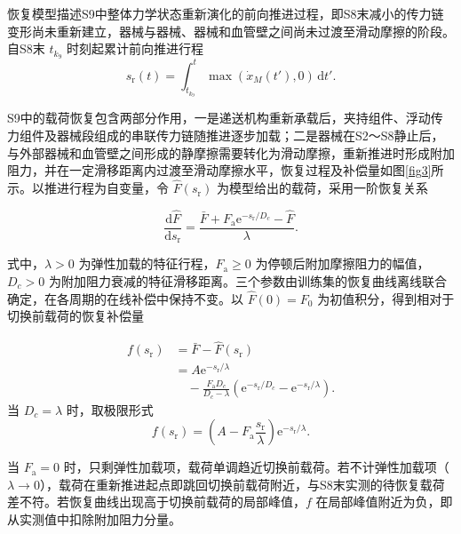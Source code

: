\documentclass{JQR_LaTeX_Template-0507/JQRnew}
\begin{document}
恢复模型描述S9中整体力学状态重新演化的前向推进过程，即S8末减小的传力链变形尚未重新建立，器械与器械、器械和血管壁之间尚未过渡至滑动摩擦的阶段。自S8末 $t_{k_9}$ 时刻起累计前向推进行程
\begin{equation}
\label{eq:recovery-travel}
s_{\mathrm r}(t)=\int_{t_{k_9}}^{t}
\max\!\left(\dot x_M(t'),0\right)\,\mathrm dt'.
\end{equation}


S9中的载荷恢复包含两部分作用，一是递送机构重新承载后，夹持组件、浮动传力组件及器械段组成的串联传力链随推进逐步加载；二是器械在S2～S8静止后，与外部器械和血管壁之间形成的静摩擦需要转化为滑动摩擦，重新推进时形成附加阻力，并在一定滑移距离内过渡至滑动摩擦水平，恢复过程及补偿量如图\ref{fig3}所示。以推进行程为自变量，令 $\hat F(s_{\mathrm r})$ 为模型给出的载荷，采用一阶恢复关系

\begin{equation}
\label{eq:recovery-ode}
\frac{\mathrm d\hat F}{\mathrm ds_{\mathrm r}}
=\frac{\bar F+F_{\mathrm a}\mathrm e^{-s_{\mathrm r}/D_c}-\hat F}{\lambda}.
\end{equation}

式中，$\lambda>0$ 为弹性加载的特征行程，$F_{\mathrm a}\ge0$ 为停顿后附加摩擦阻力的幅值，$D_c>0$ 为附加阻力衰减的特征滑移距离。三个参数由训练集的恢复曲线离线联合确定，在各周期的在线补偿中保持不变。以 $\hat F(0)=F_0$ 为初值积分，得到相对于切换前载荷的恢复补偿量

\begin{equation}
\label{eq:recovery-comp}
\begin{aligned}
f(s_{\mathrm r})&=\bar F-\hat F(s_{\mathrm r})\\
&=A\mathrm e^{-s_{\mathrm r}/\lambda}\\
&\quad-\frac{F_{\mathrm a}D_c}{D_c-\lambda}
\left(\mathrm e^{-s_{\mathrm r}/D_c}-\mathrm e^{-s_{\mathrm r}/\lambda}\right).
\end{aligned}
\end{equation}
当 $D_c=\lambda$ 时，取极限形式
\begin{equation}
\label{eq:equal-scales}
f(s_{\mathrm r})=
\left(A-F_{\mathrm a}\frac{s_{\mathrm r}}{\lambda}\right)\mathrm e^{-s_{\mathrm r}/\lambda}.
\end{equation}

当 $F_{\mathrm a}=0$ 时，只剩弹性加载项，载荷单调趋近切换前载荷。若不计弹性加载项（$\lambda\to0$），载荷在重新推进起点即跳回切换前载荷附近，与S8末实测的待恢复载荷差不符。若恢复曲线出现高于切换前载荷的局部峰值，$f$ 在局部峰值附近为负，即从实测值中扣除附加阻力分量。
\end{document}
